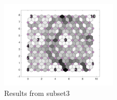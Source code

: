 \begin{figure}
        \centering
        \includegraphics[width=0.5\textwidth]{../../images0.01/M31/2D/image_subsets/subset3_dist_with_hits_t.png}
    \caption{Results from subset3}
    \label{fig: subset3}
\end{figure}